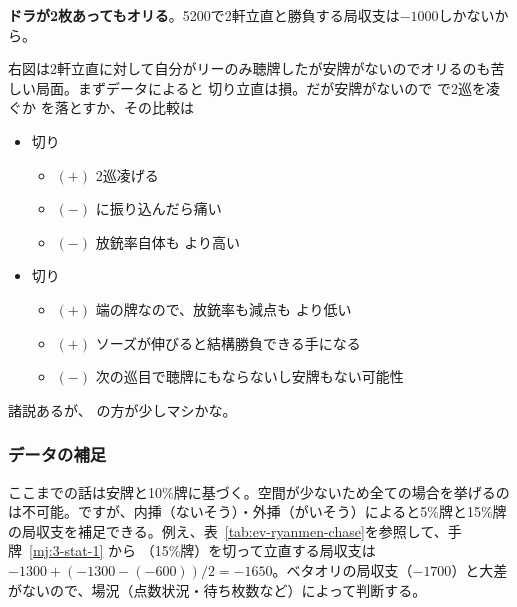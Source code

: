 \documentclass[../nankiru_main.tex]{subfiles}
\begin{document}
\begin{minipage}[t]{\textwidth}
  \begin{figure}\vspace{-1.5\topskip}
  \end{figure}
  
  \textbf{ドラが2枚あってもオリる}\citep[][pp.~153--154]{miinin-choice}。5200で2軒立直と勝負する局収支は$-1000$しかないから。

  右図は2軒立直に対して自分がリーのみ聴牌したが安牌がないのでオリるのも苦しい局面。まずデータによると  切り立直は損。だが安牌がないので  で2巡を凌ぐか  を落とすか、その比較は
  
  \begin{itemize}
    \item {} 切り
    \begin{itemize}
      \item $(+)$ 2巡凌げる
      \item $(-)$  に振り込んだら痛い
      \item $(-)$ 放銃率自体も  より高い
    \end{itemize}
    \item {} 切り
    \begin{itemize}
      \item $(+)$ 端の牌なので、放銃率も減点も  より低い
      \item $(+)$ ソーズが伸びると結構勝負できる手になる
      \item $(-)$ 次の巡目で聴牌にもならないし安牌もない可能性
    \end{itemize}
  \end{itemize}

  諸説あるが、 の方が少しマシかな\citep[][pp.~160--161, p.~219]{fkt}。
\end{minipage}


\subsubsection*{データの補足} 

ここまでの話は安牌と10\%牌に基づく。空間が少ないため全ての場合を挙げるのは不可能。ですが、内挿（ないそう）・外挿（がいそう）によると5\%牌と15\%牌の局収支を補足できる。例え、表~\ref{tab:ev-ryanmen-chase}を参照して、手牌~\ref{mj:3-stat-1} から  （15\%牌）を切って立直する局収支は$-1300 + (-1300 - (-600)) / 2 = -1650$。ベタオリの局収支（$-1700$）と大差がないので、場況（点数状況・待ち枚数など）によって判断する\citep[][pp. 93--95]{miinin-stat}。
\end{document}
